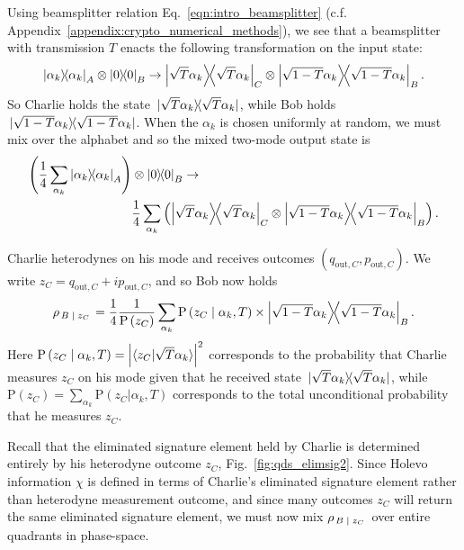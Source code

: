 Using beamsplitter relation Eq.~\ref{eqn:intro_beamsplitter} (c.f. Appendix~\ref{appendix:crypto_numerical_methods}), we see that a beamsplitter with transmission $T$ enacts the following transformation on the input state:
\begin{equation}\label{eqn:qds_coherent_state_beamsplitter}
\dyad{\alpha_k}_A \otimes \dyad{0}_B \rightarrow \dyad{\sqrt{T} \alpha_k}_C \otimes \dyad{\sqrt{1-T}\alpha_k}_{B}.
\end{equation}
So Charlie holds the state $\dyad*{\sqrt{T}\alpha_k}$, while Bob holds $\dyad*{\sqrt{1-T}\alpha_k}$. When the $\alpha_k$ is chosen uniformly at random, we must mix over the alphabet and so the mixed two-mode output state is
\begin{align}\label{eqn:qds_after_channel}
\left(\frac{1}{4}\sum_{\alpha_k} \dyad{\alpha_k}_A\right) &\otimes \dyad{0}_B \rightarrow \notag \\
&\frac{1}{4}\sum_{\alpha_k} \left(\dyad{\sqrt{T}\alpha_k}_C \otimes \dyad{\sqrt{1-T}\alpha_k}_B\right).
\end{align}

\noindent Charlie heterodynes on his mode and receives outcomes $\left(q_{\text{out}, C}, p_{\text{out}, C} \right)$. We write $z_C = q_{\text{out}, C} + i p_{\text{out}, C}$, and so Bob now holds
\begin{equation}\label{eqn:qds_bob_conditional_state}
\rho_{\left. B \given z_C \right.} = \frac{1}{4}\frac{1}{\text{P}\left(z_C\right)}\sum_{\alpha_k} \text{P}\left(z_C \given \alpha_k, T\right) \times \dyad{\sqrt{1-T}\alpha_k}_B.
\end{equation}
Here $\text{P}\left(z_C \; \middle| \; \alpha_k, T\right) = \left| \langle z_C | \sqrt{T}\alpha_k\rangle \right|^2$ corresponds to the probability that Charlie measures $z_C$ on his mode given that he received state $\dyad*{\sqrt{T}\alpha_k}$, while $\text{P}\left(z_C\right) = \sum_{\alpha_k} \text{P}\left(z_C | \alpha_k, T\right)$ corresponds to the total unconditional probability that he measures $z_C$.

Recall that the eliminated signature element held by Charlie is determined entirely by his heterodyne outcome $z_C$, Fig.~\ref{fig:qds_elimsig2}. Since Holevo information $\chi$ is defined in terms of Charlie's eliminated signature element rather than heterodyne measurement outcome, and since many outcomes $z_C$ will return the same eliminated signature element, we must now mix $\rho_{\left. B \; \middle| \; z_C \right.}$ over entire quadrants in phase-space.

